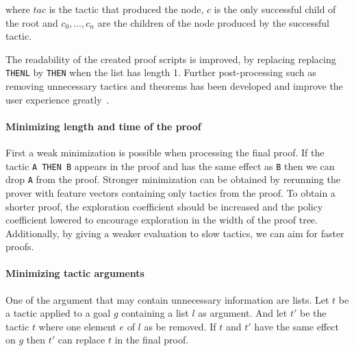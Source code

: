 \documentclass[runningheads,a4paper,draft]{svjour3}
\begin{document}
%
%
%
%
%
%
where $tac$ is the tactic that produced the node, $c$ is the
only successful child of the root and $c_0, \ldots, c_n$ are the 
children of the node produced by the successful tactic.

The readability of the created proof scripts is improved, by replacing
replacing  \texttt{THENL} by \texttt{THEN} when the list has length 1.
Further post-processing such as
removing unnecessary tactics and theorems has been developed and
improve the user experience greatly~\cite{DBLP:conf/sefm/Adams15}.

\paragraph{Minimizing length and time of the proof} 
First a weak minimization is possible when processing the final proof. If the 
tactic \texttt{A THEN B} appears in the proof and has the same effect as 
\texttt{B} then we can drop \texttt{A} from the proof.
Stronger minimization can be obtained by rerunning the prover with feature 
vectors containing only tactics 
from the proof. To obtain a shorter proof, the exploration coefficient should be
increased and the policy coefficient lowered to encourage exploration in the 
width of the proof tree. Additionally, by giving a weaker evaluation to slow 
tactics, we can aim for faster proofs.

\paragraph{Minimizing tactic arguments}
One of the argument that may contain unnecessary information are lists.
Let $t$ be a tactic applied to a goal $g$ containing a list $l$ as argument. 
And let $t'$ be the tactic $t$ where one element $e$ of $l$ as be removed. If 
$t$ and $t'$ have the same effect on $g$ then $t'$ can replace $t$ in the final 
proof.
\end{document}
